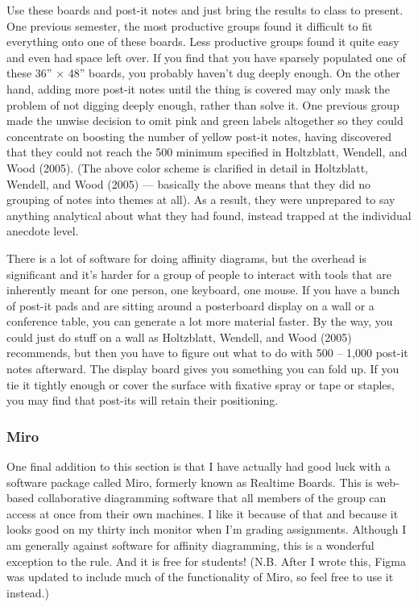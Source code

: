 Use these boards and post-it notes and just bring the results to class
to present. One previous semester, the most productive groups found it
difficult to fit everything onto one of these boards. Less productive
groups found it quite easy and even had space left over. If you find
that you have sparsely populated one of these 36'' \(\times\) 48''
boards, you probably haven't dug deeply enough. On the other hand,
adding more post-it notes until the thing is covered may only mask the
problem of not digging deeply enough, rather than solve it. One previous
group made the unwise decision to omit pink and green labels altogether
so they could concentrate on boosting the number of yellow post-it
notes, having discovered that they could not reach the 500 minimum
specified in Holtzblatt, Wendell, and Wood (2005). (The above color
scheme is clarified in detail in Holtzblatt, Wendell, and Wood (2005)
--- basically the above means that they did no grouping of notes into
themes at all). As a result, they were unprepared to say anything
analytical about what they had found, instead trapped at the individual
anecdote level.

There is a lot of software for doing affinity diagrams, but the overhead
is significant and it's harder for a group of people to interact with
tools that are inherently meant for one person, one keyboard, one mouse.
If you have a bunch of post-it pads and are sitting around a posterboard
display on a wall or a conference table, you can generate a lot more
material faster. By the way, you could just do stuff on a wall as
Holtzblatt, Wendell, and Wood (2005) recommends, but then you have to
figure out what to do with 500 -- 1,000 post-it notes afterward. The
display board gives you something you can fold up. If you tie it tightly
enough or cover the surface with fixative spray or tape or staples, you
may find that post-its will retain their positioning.

\hypertarget{miro}{%
\subsubsection{Miro}\label{miro}}

One final addition to this section is that I have actually had good luck
with a software package called Miro, formerly known as Realtime Boards.
This is web-based collaborative diagramming software that all members of
the group can access at once from their own machines. I like it because
of that and because it looks good on my thirty inch monitor when I'm
grading assignments. Although I am generally against software for
affinity diagramming, this is a wonderful exception to the rule. And it
is free for students! (N.B. After I wrote this, Figma was updated to
include much of the functionality of Miro, so feel free to use it
instead.)

